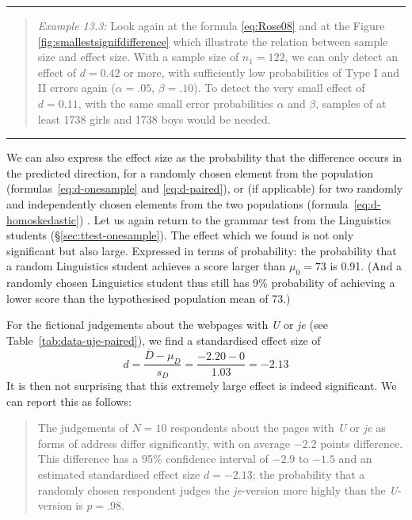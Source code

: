 \documentclass[
]{book}
\begin{document}
\begin{center}\rule{0.5\linewidth}{0.5pt}\end{center}

\begin{quote}
\emph{Example 13.3:}
Look again at the formula \eqref{eq:Rose08}
and at the Figure \ref{fig:smallestsignifdifference} which illustrate
the relation between sample size and effect size. With a sample size
of \(n_1=122\), we can only detect an effect of \(d=0.42\)
or more, with sufficiently low probabilities of Type I and II errors again
(\(\alpha=.05\), \(\beta=.10\)). To detect the very small effect of \(d=0.11\),
with the same small error probabilities \(\alpha\) and \(\beta\), samples
of at least 1738 girls and 1738 boys would be needed.
\end{quote}

\begin{center}\rule{0.5\linewidth}{0.5pt}\end{center}

We can also express the effect size as the probability that
the difference occurs in the predicted direction, for a randomly
chosen element from the population
(formulas~\eqref{eq:d-onesample} and \eqref{eq:d-paired}),
or (if applicable) for two
randomly and independently chosen elements from the two populations
(formula~\eqref{eq:d-homoskedastic}) \citep{McGraw92}. Let us again return to
the grammar test from the Linguistics students
(§\ref{sec:ttest-onesample}). The effect which we found is
not only significant but also large. Expressed in terms of probability:
the probability that a random Linguistics student achieves a score
larger than \(\mu_0=73\) is 0.91. (And a randomly chosen
Linguistics student thus still has 9\% probability of achieving a lower score than
the hypothesised population mean of 73.)

For the fictional judgements about the webpages with \emph{U} or \emph{je} (see
Table~\ref{tab:data-uje-paired}), we find a standardised
effect size of
\[d = \frac{ \overline{D}-\mu_D} {s_D} = \frac{ -2.20-0 } {1.03} = -2.13\]
It is then not surprising that this extremely large effect is indeed
significant. We can report this as follows:

\begin{quote}
The judgements of \(N=10\) respondents about the pages with \emph{U} or \emph{je}
as forms of address differ significantly, with on average \(-2.2\) points
difference. This difference has a 95\% confidence interval of
\(-2.9\) to \(-1.5\) and an estimated standardised effect size
\(d=-2.13\); the probability that a randomly chosen respondent
judges the \emph{je}-version more highly than the \emph{U}-version is \(p=.98\).
\end{quote}
\end{document}
